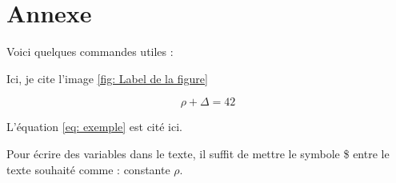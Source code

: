 \documentclass{rapportECL}
\begin{document}
\section{Annexe}




Voici quelques commandes utiles :


Ici, je cite l'image \ref{fig: Label de la figure}



\begin{equation} \label{eq: exemple}
\rho + \Delta = 42
\end{equation}

L'équation \ref{eq: exemple} est cité ici. 


Pour écrire des variables dans le texte, il suffit de mettre le symbole \$ entre le texte souhaité comme : constante $\rho$. 
\end{document}
